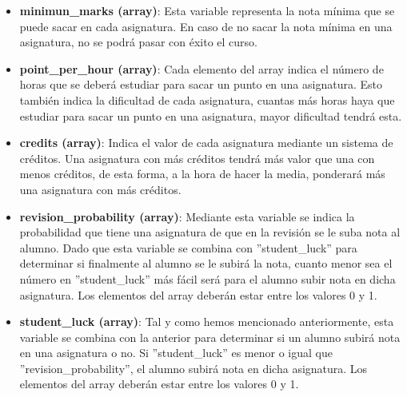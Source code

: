 \documentclass[11pt, a4paper, titlepage]{article}
\begin{document}
\vspace{5mm}

\begin{itemize}
\renewcommand{\labelitemi}{$\circ$}

\item \textbf{minimun\_marks (array)}: Esta variable representa la nota mínima que se puede sacar en cada asignatura. En caso de no sacar la nota mínima en una asignatura, no se podrá pasar con éxito el curso.

\vspace{5mm}

\item \textbf{point\_per\_hour (array)}: Cada elemento del array indica el número de horas que se deberá estudiar para sacar un punto en una asignatura. Esto también indica la dificultad de cada asignatura, cuantas más horas haya que estudiar para sacar un punto en una asignatura, mayor dificultad tendrá esta.

\vspace{5mm}

\item \textbf{credits (array)}: Indica el valor de cada asignatura mediante un sistema de créditos. Una asignatura con más créditos tendrá más valor que una con menos créditos, de esta forma, a la hora de hacer la media, ponderará más una asignatura con más créditos.

\vspace{5mm}

\item \textbf{revision\_probability (array)}: Mediante esta variable se indica la probabilidad que tiene una asignatura de que en la revisión se le suba nota al alumno. Dado que esta variable se combina con ''student\_luck'' para determinar si finalmente al alumno se le subirá la nota, cuanto menor sea el número en ''student\_luck'' más fácil será para el alumno subir nota en dicha asignatura. Los elementos del array deberán estar entre los valores 0 y 1.

\vspace{5mm}

\item \textbf{student\_luck (array)}: Tal y como hemos mencionado anteriormente, esta variable se combina con la anterior para determinar si un alumno subirá nota en una asignatura o no. Si ''student\_luck'' es menor o igual que ''revision\_probability'', el alumno subirá nota en dicha asignatura. Los elementos del array deberán estar entre los valores 0 y 1.


\end{itemize}
\end{document}
